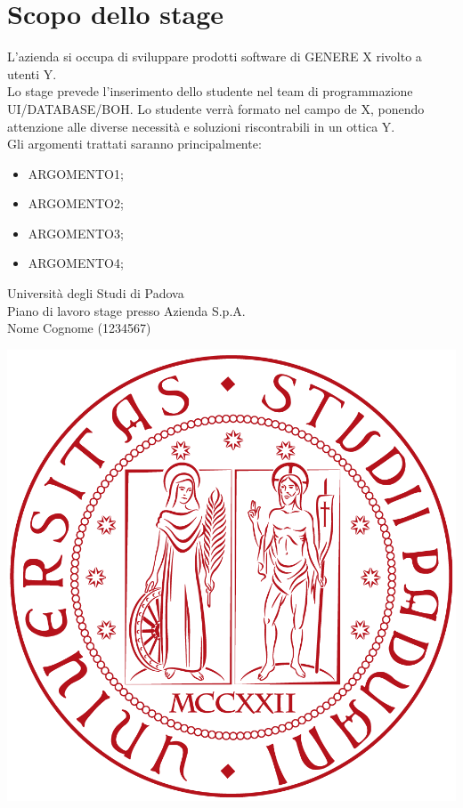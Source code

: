 \documentclass[11pt,notitlepage]{article}
\newcommand{\nomeStudente}{Nome}
\newcommand{\cognomeStudente}{Cognome}
\newcommand{\matricolaStudente}{1234567}
\newcommand{\ragioneSocAzienda}{Azienda S.p.A.}
\begin{document}
\section*{Scopo dello stage}

L'azienda si occupa di sviluppare prodotti software di GENERE X rivolto a utenti Y.\\

\noindent Lo stage prevede l'inserimento dello studente nel team di programmazione UI/DATABASE/BOH. Lo studente verrà formato nel campo de X, ponendo attenzione alle diverse necessità e soluzioni riscontrabili in un ottica Y.\\ 

\noindent Gli argomenti trattati saranno principalmente:
\begin{itemize}
	\item ARGOMENTO1;	
	\item ARGOMENTO2;	
	\item ARGOMENTO3;	
	\item ARGOMENTO4;
	
\end{itemize}

\newpage

\noindent
\parbox{0.7\columnwidth}{Università degli Studi di Padova\\
	Piano di lavoro stage presso \ragioneSocAzienda{}\\
	\nomeStudente{} \cognomeStudente{} (\matricolaStudente{})}%
\parbox{0.3\columnwidth}{
	\hfill \includegraphics[scale=0.08]{immagini/logo-unipd.png}}
\end{document}
